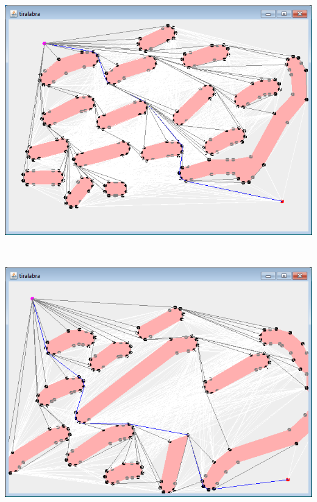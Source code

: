 \documentclass[a4paper,12pt]{article}
\begin{document}
\centerline{\includegraphics[scale=0.75]{example08.png}} \hspace*{\fill} \\
\centerline{\includegraphics[scale=0.75]{example09.png}} \hspace*{\fill} \\
\end{document}
